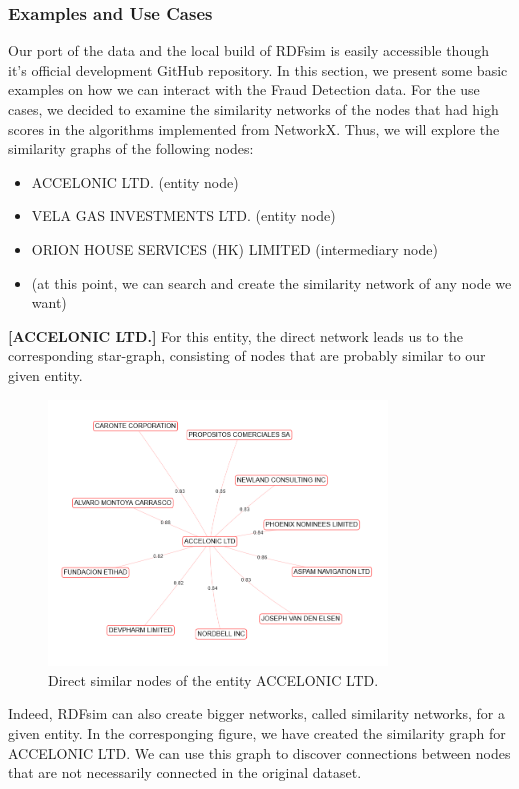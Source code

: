 \documentclass[sigconf, nonacm]{acmart}
\begin{document}
\subsubsection{Examples and Use Cases} 
Our port of the data and the local build of RDFsim is easily accessible though it's official development GitHub repository. In this section, we present some basic examples on how we can interact with the Fraud Detection data. For the use cases, we decided to examine the similarity networks of the nodes that had high scores in the algorithms implemented from NetworkX.
Thus, we will explore the similarity graphs of the following nodes:
\begin{itemize}
    \item ACCELONIC LTD. (entity node)
    \item VELA GAS INVESTMENTS LTD. (entity node)
    \item ORION HOUSE SERVICES (HK) LIMITED (intermediary node)
    \item (at this point, we can search and create the similarity network of any node we want)
\end{itemize}
\textbf{[ACCELONIC LTD.]} For this entity, the direct network leads us to the corresponding star-graph, consisting of nodes that are probably similar to our given entity.
\begin{figure}[htp]
    \centering
    \includegraphics[width=9cm]{figures/accelonic_star.png}
    \caption{Direct similar nodes of the entity ACCELONIC LTD.}
    \label{fig:galaxy}
\end{figure}
Indeed, RDFsim can also create bigger networks, called similarity networks, for a given entity. In the corresponging figure, we have created the similarity graph for ACCELONIC LTD. We can use this graph to discover connections between nodes that are not necessarily connected in the original dataset.
\end{document}
